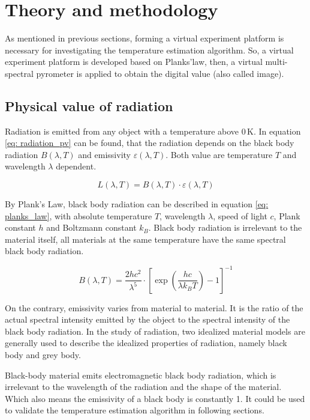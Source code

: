\chapter{Theory and methodology}%
As mentioned in previous sections, forming a virtual experiment platform 
is necessary for investigating the temperature estimation algorithm. So, a virtual 
experiment platform is developed based on Planks'law, then, a virtual multi-spectral 
pyrometer is applied to obtain the digital value (also called image). 


\section{Physical value of radiation}%
Radiation is emitted from any object with a temperature above $0 \, \text{K}$. In equation \ref{eq: radiation_pv}
can be found, that the radiation depends on the black body radiation $B(\lambda, T)$ 
and emissivity $\varepsilon(\lambda, T)$. Both value are temperature $T$ and wavelength $\lambda$ 
dependent.

\begin{equation}
    \label{eq: radiation_pv}
    L(\lambda, T) = B(\lambda, T) \cdot \varepsilon (\lambda, T)
\end{equation}


By Plank's Law, black body radiation can be described in equation \ref{eq: planks_law}, 
with absolute temperature $T$, wavelength $\lambda$, speed of light $c$, Plank 
constant $h$ and Boltzmann constant $k_B$. Black body radiation is irrelevant 
to the material itself, all materials at the same temperature have the same spectral 
black body radiation.

\begin{equation}
    \label{eq: planks_law}
    B(\lambda, T) = \frac{{2hc^2}}{{\lambda^5}} \cdot {\left[{\exp\left(\frac{{hc}}{{\lambda k_B T}}\right) - 1}\right]}^{-1}
\end{equation}


On the contrary, emissivity varies from material to material. It is the 
ratio of the actual spectral intensity emitted by the object to the spectral 
intensity of the black body radiation. In the study of radiation, two idealized 
material models are generally used to describe the idealized 
properties of radiation, namely black body and grey body. 


Black-body material emits electromagnetic black body radiation, which is irrelevant to 
the wavelength of the radiation and the shape of the material\cite{Kuhn.1987}. Which 
also means the emissivity of a black body is constantly 1. It could be used to validate
the temperature estimation algorithm in following sections.


